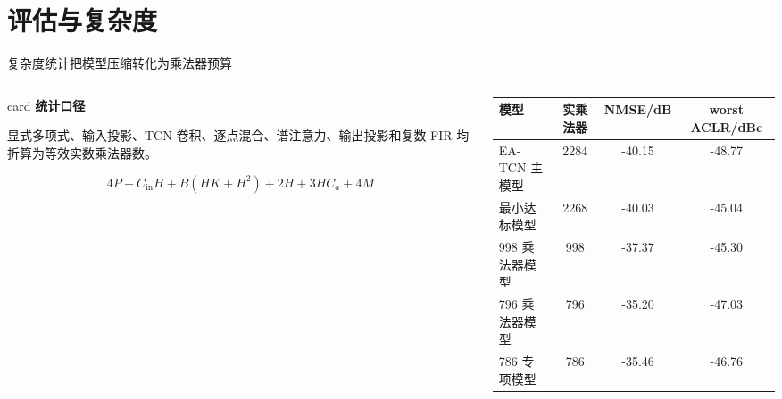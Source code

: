 \documentclass[20pt, cjk, slidetop, table]{beamer}
\begin{document}
\section{评估与复杂度}
\begin{frame}{复杂度统计把模型压缩转化为乘法器预算}
  \begin{columns}[T,onlytextwidth]
    \begin{column}{0.43\linewidth}
      \begin{beamercolorbox}[wd=\linewidth,sep=0.8em]{card}
        \textbf{统计口径}\par
        显式多项式、输入投影、TCN 卷积、逐点混合、谱注意力、输出投影和复数 FIR 均折算为等效实数乘法器数。
      \end{beamercolorbox}

      \vspace{0.45cm}
      \[
        4P + C_{\mathrm{in}}H + B(HK+H^2)+2H+3HC_a+4M
      \]
    \end{column}
    \begin{column}{0.53\linewidth}
      \begin{tabularx}{\linewidth}{Y c c c}
        \toprule
        模型 & 实乘法器 & NMSE/dB & worst ACLR/dBc \\
        \midrule
        EA-TCN 主模型 & 2284 & \textcolor{passgreen}{-40.15} & \textcolor{passgreen}{-48.77} \\
        最小达标模型 & 2268 & \textcolor{passgreen}{-40.03} & \textcolor{passgreen}{-45.04} \\
        998 乘法器模型 & 998 & \textcolor{warnorange}{-37.37} & \textcolor{passgreen}{-45.30} \\
        796 乘法器模型 & 796 & \textcolor{warnorange}{-35.20} & \textcolor{passgreen}{-47.03} \\
        786 专项模型 & 786 & \textcolor{warnorange}{-35.46} & \textcolor{passgreen}{-46.76} \\
        \bottomrule
      \end{tabularx}
    \end{column}
  \end{columns}
\end{frame}
\end{document}
